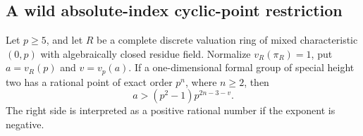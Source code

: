 \subsection{A wild absolute-index cyclic-point restriction}

\begin{lemma}
\label{lem:B-RD76-point}
Let \(p\ge5\), and let \(R\) be a complete discrete valuation
ring of mixed characteristic \((0,p)\) with algebraically closed
residue field. Normalize \(v_R(\pi_R)=1\), put
\(a=v_R(p)\) and \(v=v_p(a)\). If a one-dimensional formal
group of special height two has a rational point of exact order
\(p^n\), where \(n\ge2\), then
\[
             a>(p^2-1)p^{2n-3-v}.                 \tag{B-RD76.1}
\]
The right side is interpreted as a positive rational number if
the exponent is negative.
\end{lemma}
